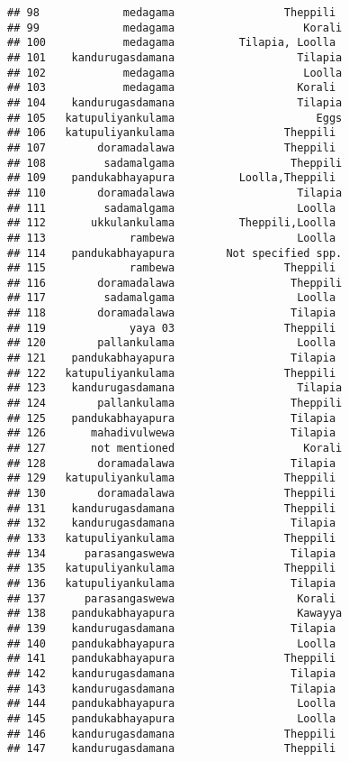 \documentclass[
]{article}
\begin{document}
\begin{verbatim}
## 98             medagama                 Theppili 
## 99             medagama                    Korali
## 100            medagama          Tilapia, Loolla 
## 101    kandurugasdamana                   Tilapia
## 102            medagama                    Loolla
## 103            medagama                   Korali 
## 104    kandurugasdamana                   Tilapia
## 105   katupuliyankulama                      Eggs
## 106   katupuliyankulama                 Theppili 
## 107        doramadalawa                 Theppili 
## 108         sadamalgama                  Theppili
## 109    pandukabhayapura          Loolla,Theppili 
## 110        doramadalawa                   Tilapia
## 111         sadamalgama                   Loolla 
## 112       ukkulankulama          Theppili,Loolla 
## 113             rambewa                   Loolla 
## 114    pandukabhayapura        Not specified spp.
## 115             rambewa                 Theppili 
## 116        doramadalawa                  Theppili
## 117         sadamalgama                   Loolla 
## 118        doramadalawa                  Tilapia 
## 119             yaya 03                 Theppili 
## 120        pallankulama                   Loolla 
## 121    pandukabhayapura                  Tilapia 
## 122   katupuliyankulama                 Theppili 
## 123    kandurugasdamana                   Tilapia
## 124        pallankulama                  Theppili
## 125    pandukabhayapura                  Tilapia 
## 126       mahadivulwewa                  Tilapia 
## 127       not mentioned                    Korali
## 128        doramadalawa                  Tilapia 
## 129   katupuliyankulama                 Theppili 
## 130        doramadalawa                 Theppili 
## 131    kandurugasdamana                 Theppili 
## 132    kandurugasdamana                  Tilapia 
## 133   katupuliyankulama                 Theppili 
## 134      parasangaswewa                  Tilapia 
## 135   katupuliyankulama                 Theppili 
## 136   katupuliyankulama                  Tilapia 
## 137      parasangaswewa                   Korali 
## 138    pandukabhayapura                   Kawayya
## 139    kandurugasdamana                  Tilapia 
## 140    pandukabhayapura                   Loolla 
## 141    pandukabhayapura                 Theppili 
## 142    kandurugasdamana                  Tilapia 
## 143    kandurugasdamana                  Tilapia 
## 144    pandukabhayapura                   Loolla 
## 145    pandukabhayapura                   Loolla 
## 146    kandurugasdamana                 Theppili 
## 147    kandurugasdamana                 Theppili 

\end{verbatim}
\end{document}

